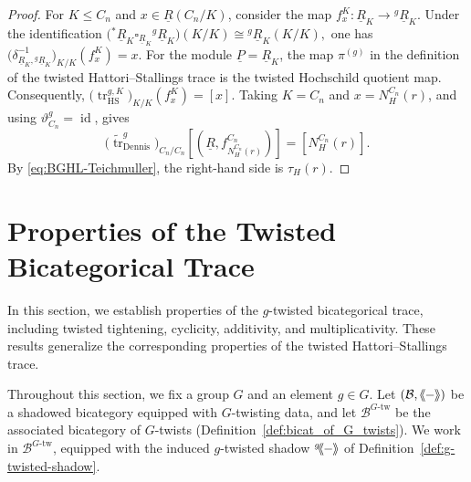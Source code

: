\documentclass[11pt,oneside]{amsart}
\DeclareMathOperator{\tr}{tr}
\DeclareMathOperator{\id}{id}
\numberwithin{equation}{section}
\numberwithin{figure}{section}
\theoremstyle{plain}
\theoremstyle{definition}
\theoremstyle{remark}
\newcommand{\shspace}{\hspace{.5mm}} %
\newcommand{\sh}[1]{{\ensuremath{\shspace\hspace{1mm}\makebox[-1mm]{$\langle$}\makebox[0mm]{$\langle$}\hspace{1mm}{#1}\makebox[1mm]{$\rangle$}\makebox[0mm]{$\rangle$}\shspace}}}
\begin{document}
\begin{proof}
For \(K\leq C_n\) and
\(x\in\underline R(C_n/K)\), consider the map
\(f_x^K\colon\underline R_K\to{}^g\underline R_K\).
Under the identification
\(
\bigl(
{}^*\underline R_K
\square_{\underline R_K}
{}^g\underline R_K
\bigr)(K/K)
\cong
{}^g\underline R_K(K/K),
\) one has
\(
\bigl(
\delta_{\underline R_K,{}^g\underline R_K}^{-1}
\bigr)_{K/K}(f_x^K)
=
x.
\)
For the module \(\underline P=\underline R_K\), the map
\(\pi^{(g)}\) in the definition of the twisted
Hattori--Stallings trace is the twisted Hochschild quotient map.
Consequently,
\(
\bigl(\tr_{\mathrm{HS}}^{g,K}\bigr)_{K/K}(f_x^K)
=
[x].
\)
Taking \(K=C_n\) and \(x=N_H^{C_n}(r)\), and using
\(\vartheta_{C_n}^g=\id\), gives
\[
\bigl(\widetilde{\tr}_{\mathrm{Dennis}}^g\bigr)_{C_n/C_n}
\left[
\left(
\underline R,
f_{N_H^{C_n}(r)}^{C_n}
\right)
\right]
=
[N_H^{C_n}(r)].
\]
By \eqref{eq:BGHL-Teichmuller}, the right-hand side is
\(\tau_H(r)\).
\end{proof}

 





\section{Properties of the Twisted Bicategorical Trace}

In this section, we establish properties of the \(g\)-twisted
bicategorical trace, including twisted tightening, cyclicity, additivity,
and multiplicativity. These results generalize the corresponding
properties of the twisted Hattori--Stallings trace.

Throughout this section, we fix a group \(G\) and an element \(g\in G\).
Let \((\mathcal B,\sh{-})\) be a shadowed bicategory equipped with
\(G\)-twisting data, and let
\(
\mathcal B^{G\text{-tw}}
\)
be the associated bicategory of \(G\)-twists
(Definition~\ref{def:bicat_of_G_twists}). We work in
\(\mathcal B^{G\text{-tw}}\), equipped with the induced \(g\)-twisted
shadow
$
{}^g\!\sh{-}$
of Definition~\ref{def:g-twisted-shadow}.
\end{document}
